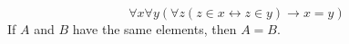 \guard



\begin{defn}
\label{defn:extensionality}
  \[ \forall x\forall y(\forall z(z\in x\leftrightarrow z\in y)\rightarrow x=y) \]
  If $A$ and $B$ have the same elements, then $A=B$.
\end{defn}
